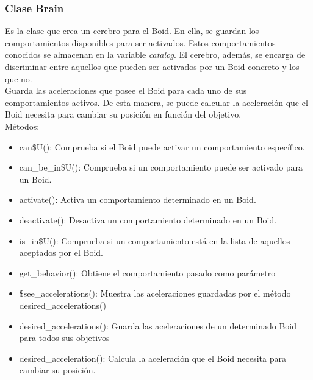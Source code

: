 \subsubsection{Clase Brain}
\label{subsubsection:brain}

Es la clase que crea un cerebro para el Boid. En ella, se guardan los comportamientos disponibles para ser activados. Estos 
comportamientos conocidos se almacenan en la variable \textit{catalog}. El cerebro, además, se encarga de discriminar entre aquellos que 
pueden ser activados por un Boid concreto y los que no.\\

Guarda las aceleraciones que posee el Boid para cada uno de sus comportamientos activos. De esta manera, se puede calcular la aceleración que 
el Boid necesita para cambiar su posición en función del objetivo.\\


Métodos:
\begin{itemize}
\item can\$U():
Comprueba si el Boid puede activar un comportamiento específico.

\item can\_be\_in\$U():
Comprueba si un comportamiento puede ser activado para un Boid.

\item activate():
Activa un comportamiento determinado en un Boid.

\item deactivate():
Desactiva un comportamiento determinado en un Boid.

\item is\_in\$U():
Comprueba si un comportamiento está en la lista de aquellos aceptados por el Boid.

\item get\_behavior():
Obtiene el comportamiento pasado como parámetro

\item \$see\_accelerations():
Muestra las aceleraciones guardadas por el método desired\_accelerations()

\item desired\_accelerations():
Guarda las aceleraciones de un determinado Boid para todos sus objetivos

\item desired\_acceleration():
Calcula la aceleración que el Boid necesita para cambiar su posición.
\end{itemize}



